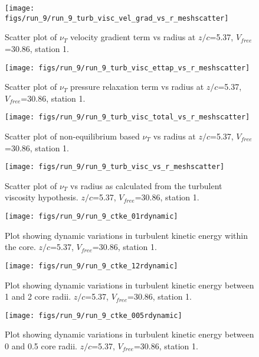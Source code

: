 \begin{figure}[H]
\centering
\texttt{[image: figs/run\_9/run\_9\_turb\_visc\_vel\_grad\_vs\_r\_meshscatter]}
\caption{Scatter plot of $\nu_T$ velocity gradient term vs radius at $z/c$=5.37, $V_{free}$=30.86, station 1.}
\end{figure}


\begin{figure}[H]
\centering
\texttt{[image: figs/run\_9/run\_9\_turb\_visc\_ettap\_vs\_r\_meshscatter]}
\caption{Scatter plot of $\nu_T$ pressure relaxation term vs radius at $z/c$=5.37, $V_{free}$=30.86, station 1.}
\end{figure}


\begin{figure}[H]
\centering
\texttt{[image: figs/run\_9/run\_9\_turb\_visc\_total\_vs\_r\_meshscatter]}
\caption{Scatter plot of non-equilibrium based $\nu_T$ vs radius at $z/c$=5.37, $V_{free}$=30.86, station 1.}
\end{figure}


\begin{figure}[H]
\centering
\texttt{[image: figs/run\_9/run\_9\_turb\_visc\_vs\_r\_meshscatter]}
\caption{Scatter plot of $\nu_T$ vs radius as calculated from the turbulent viscosity hypothesis. $z/c$=5.37, $V_{free}$=30.86, station 1.}
\end{figure}


\begin{figure}[H]
\centering
\texttt{[image: figs/run\_9/run\_9\_ctke\_01rdynamic]}
\caption{Plot showing dynamic variations in turbulent kinetic energy within the core. $z/c$=5.37, $V_{free}$=30.86, station 1.}
\end{figure}


\begin{figure}[H]
\centering
\texttt{[image: figs/run\_9/run\_9\_ctke\_12rdynamic]}
\caption{Plot showing dynamic variations in turbulent kinetic energy between 1 and 2 core radii. $z/c$=5.37, $V_{free}$=30.86, station 1.}
\end{figure}


\begin{figure}[H]
\centering
\texttt{[image: figs/run\_9/run\_9\_ctke\_005rdynamic]}
\caption{Plot showing dynamic variations in turbulent kinetic energy between 0 and 0.5 core radii. $z/c$=5.37, $V_{free}$=30.86, station 1.}
\end{figure}


